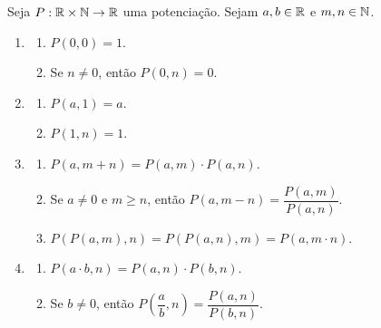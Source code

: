 \begin{theorem} \label{teo.calc1:propriedades_potenciação}
    Seja $P : \mathbb{R} \times \mathbb{N} \to \mathbb{R}$ uma potenciação. Sejam $a,b \in \mathbb{R}$ e $m,n \in \mathbb{N}$.
    \begin{enumerate}[leftmargin=*, align=left, label=\textbf{(\alph*)}]
        \item
            \begin{enumerate}[label=\roman*.]
                \item $P(0,0) = 1$.
                \item Se $n \neq 0$, então $P(0,n) = 0$.
            \end{enumerate}
        \item
            \begin{enumerate}[label=\roman*.]
                \item $P(a,1) = a$.
                \item $P(1,n) = 1$.
            \end{enumerate}
        \item
            \begin{enumerate}[label=\roman*.]
                \item $P(a,m+n) = P(a,m) \cdot P(a,n)$.
                \item Se $a \neq 0$ e $m \geq n$, então $P(a,m-n) = \dfrac{P(a,m)}{P(a,n)}$.
                \item $P(P(a,m),n) = P(P(a,n),m) = P(a,m \cdot n)$.
            \end{enumerate}
        \item
            \begin{enumerate}[label=\roman*.]
                \item $P(a \cdot b,n) = P(a,n) \cdot P(b,n)$.
                \item Se $b \neq 0$, então $P\left(\dfrac{a}{b},n\right) = \dfrac{P(a,n)}{P(b,n)}$.
            \end{enumerate}
    \end{enumerate}
\end{theorem}

